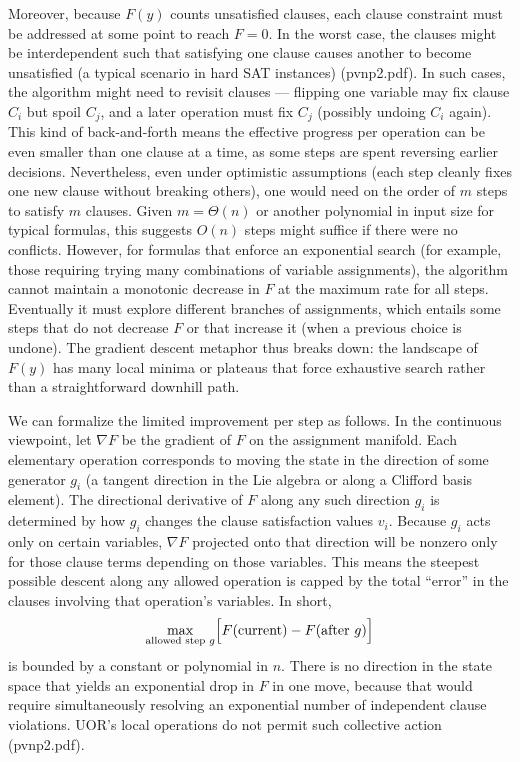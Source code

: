 \documentclass[11pt]{article}
\begin{document}
Moreover, because \(F(y)\) counts unsatisfied clauses, each clause constraint must be addressed at some point to reach \(F=0\). In the worst case, the clauses might be interdependent such that satisfying one clause causes another to become unsatisfied (a typical scenario in hard SAT instances) (pvnp2.pdf). In such cases, the algorithm might need to revisit clauses --- flipping one variable may fix clause \(C_i\) but spoil \(C_j\), and a later operation must fix \(C_j\) (possibly undoing \(C_i\) again). This kind of back-and-forth means the effective progress per operation can be even smaller than one clause at a time, as some steps are spent reversing earlier decisions. Nevertheless, even under optimistic assumptions (each step cleanly fixes one new clause without breaking others), one would need on the order of \(m\) steps to satisfy \(m\) clauses. Given \(m = \Theta(n)\) or another polynomial in input size for typical formulas, this suggests \(O(n)\) steps might suffice if there were no conflicts. However, for formulas that enforce an exponential search (for example, those requiring trying many combinations of variable assignments), the algorithm cannot maintain a monotonic decrease in \(F\) at the maximum rate for all steps. Eventually it must explore different branches of assignments, which entails some steps that do not decrease \(F\) or that increase it (when a previous choice is undone). The gradient descent metaphor thus breaks down: the landscape of \(F(y)\) has many local minima or plateaus that force exhaustive search rather than a straightforward downhill path.

We can formalize the limited improvement per step as follows. In the continuous viewpoint, let \(\nabla F\) be the gradient of \(F\) on the assignment manifold. Each elementary operation corresponds to moving the state in the direction of some generator \(g_i\) (a tangent direction in the Lie algebra or along a Clifford basis element). The directional derivative of \(F\) along any such direction \(g_i\) is determined by how \(g_i\) changes the clause satisfaction values \(v_i\). Because \(g_i\) acts only on certain variables, \(\nabla F\) projected onto that direction will be nonzero only for those clause terms depending on those variables. This means the steepest possible descent along any allowed operation is capped by the total “error” in the clauses involving that operation’s variables. In short, 
\[
\max_{\text{allowed step } g} \Bigl[F(\text{current}) - F(\text{after } g)\Bigr]
\]
is bounded by a constant or polynomial in \(n\). There is no direction in the state space that yields an exponential drop in \(F\) in one move, because that would require simultaneously resolving an exponential number of independent clause violations. UOR’s local operations do not permit such collective action (pvnp2.pdf).
\end{document}
